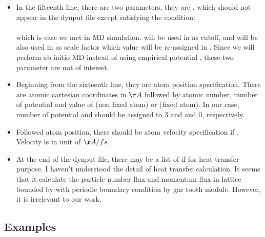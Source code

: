 \documentclass[11pt]{JHEP3}
\begin{document}
\begin{itemize}
\item In the fifteenth line, there are two parameters, they are
, which should not appear in the dynput file
except satisfying the condition:\\
\\
which is case we met in MD simulation. 
will be used in  as cutoff, and  will be
also used in  as scale factor which value will be
re-assigned in . Since we will perform ab initio MD
instead of using empirical potential , these two
parameter are not of interest.

\item Beginning from the sixteenth line, they are atom position
specification. There are atomic cartesian coordinates in $\AA$
followed by atomic number, number of potential and value of
 (non fixed atom) or  (fixed atom). In
our case, number of potential  and  should
be assigned to 3 and and 0, respectively.

\item Followed atom position, there should be atom velocity
specification if . Velocity is in unit of $\AA/fs$.

\item At the end of the dynput file, there may be a list of
 if  for heat transfer
purpose. I haven't understood the detail of heat transfer
calculation. It seems that it calculate the particle number flux and
momentum flux in lattice bounded by  with periodic
boundary condition by gas tooth module. However, it is irrelevant to
our work.

\end{itemize}


\subsection{Examples}
\end{document}
